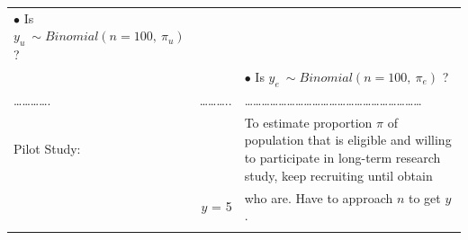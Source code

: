 \documentclass[]{book}
\begin{document}
\begin{longtable}[]{@{}lrl@{}}
\begin{minipage}[t]{0.16\columnwidth}
\(\bullet\) Is \(y_u ~ \sim Binomial(n = 100, \ \pi_u)\) ?\strut
\end{minipage}\tabularnewline
\begin{minipage}[t]{0.60\columnwidth}\raggedright
\strut
\end{minipage} & \begin{minipage}[t]{0.16\columnwidth}\raggedleft
\strut
\end{minipage} & \begin{minipage}[t]{0.16\columnwidth}\raggedright
\(\bullet\) Is \(y_e ~ \sim Binomial(n = 100, \ \pi_e)\) ?\strut
\end{minipage}\tabularnewline
\begin{minipage}[t]{0.60\columnwidth}\raggedright
\ldots{}\ldots{}\ldots{}\ldots{}.\strut
\end{minipage} & \begin{minipage}[t]{0.16\columnwidth}\raggedleft
\ldots{}\ldots{}\ldots{}..\strut
\end{minipage} & \begin{minipage}[t]{0.16\columnwidth}\raggedright
\ldots{}\ldots{}\ldots{}\ldots{}\ldots{}\ldots{}\ldots{}\ldots{}\ldots{}\ldots{}\ldots{}\ldots{}\ldots{}\ldots{}\ldots{}\ldots{}\ldots{}\ldots{}\ldots{}\ldots{}\ldots{}\strut
\end{minipage}\tabularnewline
\begin{minipage}[t]{0.60\columnwidth}\raggedright
Pilot Study:\strut
\end{minipage} & \begin{minipage}[t]{0.16\columnwidth}\raggedleft
\strut
\end{minipage} & \begin{minipage}[t]{0.16\columnwidth}\raggedright
To estimate proportion \(\pi\) of population that is eligible and willing to participate in long-term research study, keep recruiting until obtain\strut
\end{minipage}\tabularnewline
\begin{minipage}[t]{0.60\columnwidth}\raggedright
\strut
\end{minipage} & \begin{minipage}[t]{0.16\columnwidth}\raggedleft
\(y\) = 5\strut
\end{minipage} & \begin{minipage}[t]{0.16\columnwidth}\raggedright
who are. Have to approach \(n\) to get \(y\).\strut
\end{minipage}\tabularnewline
\begin{minipage}[t]{0.60\columnwidth}\raggedright

\end{minipage}
\end{longtable}
\end{document}
